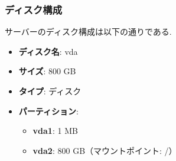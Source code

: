 \documentclass[b5paper,12pt,dvipdfmx]{jsreport}
\begin{document}
\subsubsection{ディスク構成}
サーバーのディスク構成は以下の通りである.
\begin{itemize}
    \item \textbf{ディスク名}: vda
    \item \textbf{サイズ}: 800 GB
    \item \textbf{タイプ}: ディスク
    \item \textbf{パーティション}:
    \begin{itemize}
        \item \textbf{vda1}: 1 MB
        \item \textbf{vda2}: 800 GB（マウントポイント: /）
    \end{itemize}
\end{itemize}
\end{document}
